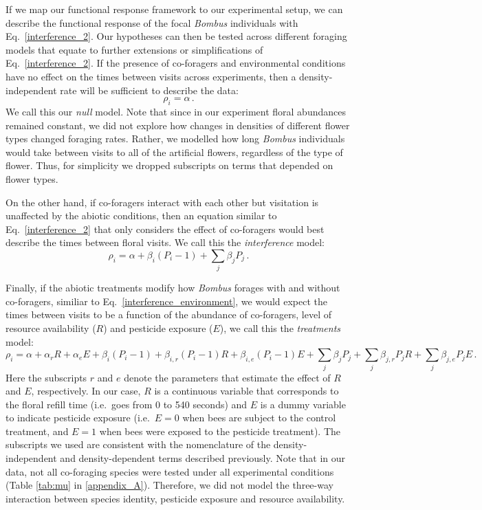 \begin{refsection}
If we map our functional response framework to our experimental setup, we can describe the functional response of the focal \textit{Bombus} individuals with Eq.~\ref{interference_2}. Our hypotheses can then be tested across different foraging models that equate to further extensions or simplifications of Eq.~\ref{interference_2}. If the presence of co-foragers and environmental conditions have no effect on the times between visits across experiments, then a density-independent rate will be sufficient to describe the data:
\begin{equation}
    \rho_{i}= \alpha \,.
    \label{null}
\end{equation}
We call this our \textit{null} model. Note that since in our experiment floral abundances remained constant, we did not explore how changes in densities of different flower types changed foraging rates. Rather, we modelled how long \textit{Bombus} individuals would take between visits to all of the artificial flowers, regardless of the type of flower. Thus, for simplicity we dropped subscripts on terms that depended on flower types.

On the other hand, if co-foragers interact with each other but visitation is unaffected by the abiotic conditions, then an equation similar to Eq.~\ref{interference_2} that only considers the effect of co-foragers would best describe the times between floral visits. We call this the \textit{interference} model:
\begin{equation}
\label{interference_3}
		\rho_{i} =\alpha + \beta_{i} (P_{i}-1) + \sum_{j}\beta_{j}P_{j} \,.
\end{equation}

Finally, if the abiotic treatments modify how \textit{Bombus} forages with and without co-foragers, similiar to Eq.~\ref{interference_environment}, we would expect the times between visits to be a function of the abundance of co-foragers, level of resource availability ($R$) and pesticide exposure ($E$), we call this the \textit{treatments} model:
\begin{equation}
\label{treatments}
\rho_{i} =\alpha + \alpha_{r} R+   \alpha_{e}E +  \beta_{i} (P_{i}-1) +  \beta_{i,r} (P_{i}-1) R +  \beta_{i,e} (P_{i}-1) E        + \sum_{j}\beta_{j}P_{j}  +  \sum_{j}\beta_{j,r}P_{j}R +  \sum_{j}\beta_{j,e}P_{j}  E \,.
\end{equation}
Here the subscripts  $r$ and $e$ denote the parameters that estimate the effect of $R$ and $E$, respectively. In our case, $R$ is a continuous variable that corresponds to the floral refill time (i.e.\ goes from 0 to 540 seconds) and $E$ is a dummy variable to indicate pesticide exposure (i.e.\ $E = 0$ when bees are subject to the control treatment, and $E=1$ when bees were exposed to the pesticide treatment). The subscripts we used are consistent with the nomenclature of the density-independent and density-dependent terms described previously. Note that in our data, not all co-foraging species were tested under all experimental conditions (Table \ref{tab:mu} in \autoref{appendix_A}). Therefore, we did not model the three-way interaction between species identity, pesticide exposure and resource availability.



\end{refsection}
